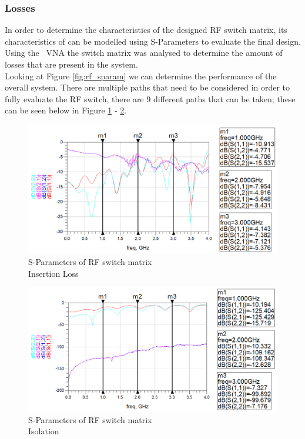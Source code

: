 \documentclass[12pt,openany,a4paper]{book}
\begin{document}
\subsubsection{Losses}
In order to determine the characteristics of the designed RF switch matrix, its characteristics of can be modelled using S-Parameters to evaluate the final design. Using the \model \ VNA the switch matrix was analysed to determine the amount of losses that are present in the system. \\
Looking at Figure \ref{fig:rf_sparam} we can determine the performance of the overall system. There are multiple paths that need to be considered in order to fully evaluate the RF switch, there are 9 different paths that can be taken; these can be seen below in Figure \ref{fig:rf_sparam1} - \ref{fig:rf_sparam2}.
\begin{figure}[H]
	\centering
    \includegraphics[width=1\textwidth]{switchmatrix-open.png}
	\caption{S-Parameters of RF switch matrix \\ Insertion Loss}
	\label{fig:rf_sparam1}
\end{figure} 
\begin{figure}[H]
	\centering
    \includegraphics[width=1\textwidth]{switchmatrix.png}
	\caption{S-Parameters of RF switch matrix\\ Isolation}
	\label{fig:rf_sparam2}
\end{figure} 
\end{document}
